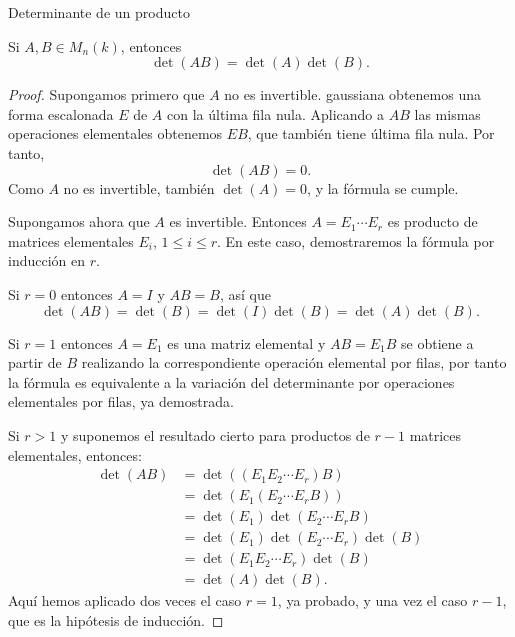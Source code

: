 \begin{frame}[allowframebreaks]{Determinante de un producto}

\begin{theorem}
Si \(A,B\in M_n(k)\), entonces
\[
\det(AB)=\det(A)\det(B).
\]
\end{theorem}

\begin{proof}
Supongamos primero que \(A\) no es invertible. 
gaussiana obtenemos una forma escalonada \(E\) de \(A\) con la última
fila nula. Aplicando a \(AB\) las mismas operaciones elementales obtenemos
\(EB\), que también tiene última fila nula. Por tanto,
\[
\det(AB)=0.
\]
Como \(A\) no es invertible, también \(\det(A)=0\), y la fórmula se
cumple.

Supongamos ahora que \(A\) es invertible. Entonces $A=E_1\cdots E_r$ es producto de matrices elementales $E_i$, $1\leq i\leq r$. En este caso, demostraremos la fórmula por inducción en $r$.

\medskip

Si $r=0$ entonces $A=I$ y $AB=B$, así que
\[
\det(AB)=\det(B)=\det(I)\det(B)=\det(A)\det(B).
\]

Si $r=1$ entonces $A=E_1$ es una matriz elemental y $AB=E_1B$ se obtiene a partir de $B$ realizando la correspondiente operación elemental por filas, por tanto la fórmula es equivalente a la variación del determinante por operaciones elementales por filas, ya demostrada.

\medskip

Si $r>1$ y suponemos el resultado cierto para productos de $r-1$ matrices elementales, entonces:
\begin{align*}
	\det(AB)&=\det((E_1E_2\cdots E_r)B)\\
	&=\det(E_1(E_2\cdots E_rB))\\
	&=\det(E_1)\det(E_2\cdots E_rB)\\
	&=\det(E_1)\det(E_2\cdots E_r)\det(B)\\
	&=\det(E_1E_2\cdots E_r)\det(B)\\
	&=\det(A)\det(B).
\end{align*}
Aquí hemos aplicado dos veces el caso $r=1$, ya probado, y una vez el caso $r-1$, que es la hipótesis de inducción.
\end{proof}

\end{frame}


